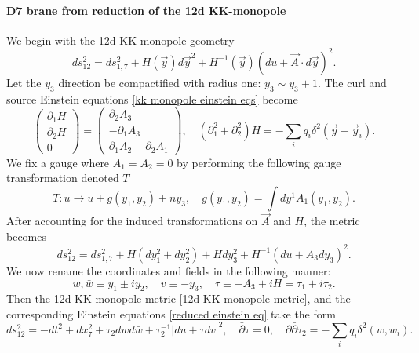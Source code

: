 \paragraph{D7 brane from reduction of the 12d KK-monopole}
We begin with the 12d KK-monopole geometry
\begin{equation}
ds_{12}^2=ds_{1,7}^2+H(\vec{y})d\vec{y}^2 + H^{-1}(\vec{y})(du+\vec{A} \cdot d\vec{y})^2.
\label{12d KK-monopole metric}
\end{equation}
Let the $y_3$ direction be compactified with radius one: $y_3\sim y_3 + 1$.
The curl and source Einstein equations \eqref{kk monopole einstein eqs} become
\begin{equation}
\begin{pmatrix}
\partial_1 H\\
\partial_2 H\\
0
\end{pmatrix}
=\begin{pmatrix}
\partial_2 A_3\\
-\partial_1 A_3\\
\partial_1 A_2-\partial_2 A_1
\end{pmatrix},\quad
(\partial_1^2+\partial_2^2)H=-\sum_iq_i\delta^2(\vec{y}-\vec{y}_i).
\label{reduced einstein eq}
\end{equation}
We fix a gauge where $A_1=A_2=0$ by performing the following gauge transformation denoted $T$
\begin{equation}
T:u\to u+g(y_1,y_2)+ny_3,\quad
g(y_1,y_2)=\int dy^1 A_1 (y_1,y_2).
\label{T gauge transformation}
\end{equation}
After accounting for the induced transformations on $\vec{A}$ and $H$, the metric becomes
\begin{equation}
ds_{12}^2=ds_{1,7}^2+
H(dy_{1}^2 + dy_2^2)
+Hdy_3^2
+H^{-1}(du+A_3dy_3)^2.
\end{equation}
We now rename the coordinates and fields in the following manner:
\begin{equation}
w,\bar w\equiv y_1\pm i y_2,\quad 
v\equiv - y_3,\quad
\tau \equiv-A_3+iH=\tau_1+i\tau_2.
\end{equation}
Then the 12d KK-monopole metric \eqref{12d KK-monopole metric}, and the corresponding Einstein equations \eqref{reduced einstein eq} take the form
\begin{equation}
ds_{12}^2=-dt^2 +dx_7^2+\tau_2 dwd\bar w + \tau_2^{-1}|du+\tau dv|^2,\quad
\bar\partial \tau = 0,\quad
\partial\bar\partial \tau_2=-\sum_i q_i \delta^2(w,w_i).
\label{12d KK-monopole in complex coordinates}
\end{equation}
